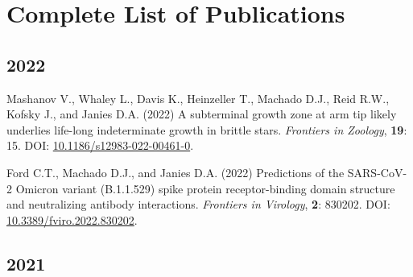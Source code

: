 
\section{Complete List of Publications}



\subsection{2022}

    {\setlength{\parskip}{.5em}\renewcommand{\baselinestretch}{2.0}\begin{hangparas}{.25in}{1}
    
    	Mashanov V., Whaley L., Davis K., Heinzeller T., Machado D.J., Reid R.W., Kofsky J., and Janies D.A. (2022) A subterminal growth zone at arm tip likely underlies life-long indeterminate growth in brittle stars. \textit{Frontiers in Zoology}, \textbf{19}: 15. DOI: \href{https://doi.org/10.1186/s12983-022-00461-0}{10.1186/s12983-022-00461-0}.
    	
    	Ford C.T., Machado D.J., and Janies D.A. (2022) Predictions of the SARS-CoV-2 Omicron variant (B.1.1.529) spike protein receptor-binding domain structure and neutralizing antibody interactions. \textit{Frontiers in Virology}, \textbf{2}: 830202. DOI: \href{https://doi.org/10.3389/fviro.2022.830202}{10.3389/fviro.2022.830202}.
    
    \end{hangparas}}


\subsection{2021}
    
